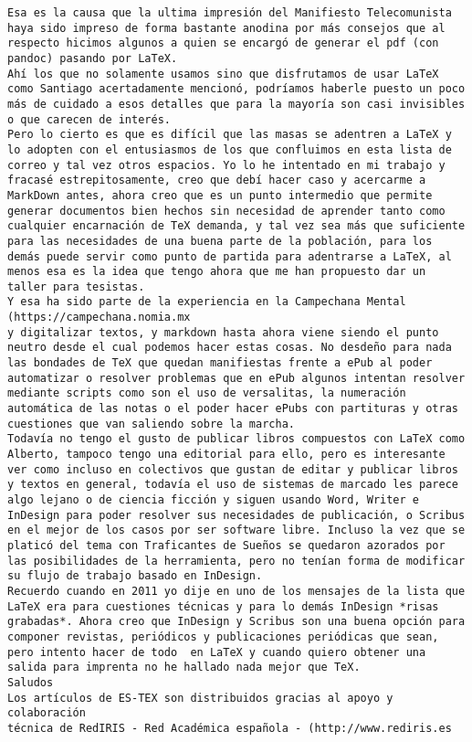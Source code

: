 \documentclass[a4paper,10pt]{article}
\begin{document}
\begin{lstlisting}
Esa es la causa que la ultima impresión del Manifiesto Telecomunista
haya sido impreso de forma bastante anodina por más consejos que al
respecto hicimos algunos a quien se encargó de generar el pdf (con
pandoc) pasando por LaTeX.
Ahí los que no solamente usamos sino que disfrutamos de usar LaTeX
como Santiago acertadamente mencionó, podríamos haberle puesto un poco
más de cuidado a esos detalles que para la mayoría son casi invisibles
o que carecen de interés.
Pero lo cierto es que es difícil que las masas se adentren a LaTeX y
lo adopten con el entusiasmos de los que confluimos en esta lista de
correo y tal vez otros espacios. Yo lo he intentado en mi trabajo y
fracasé estrepitosamente, creo que debí hacer caso y acercarme a
MarkDown antes, ahora creo que es un punto intermedio que permite
generar documentos bien hechos sin necesidad de aprender tanto como
cualquier encarnación de TeX demanda, y tal vez sea más que suficiente
para las necesidades de una buena parte de la población, para los
demás puede servir como punto de partida para adentrarse a LaTeX, al
menos esa es la idea que tengo ahora que me han propuesto dar un
taller para tesistas.
Y esa ha sido parte de la experiencia en la Campechana Mental
(https://campechana.nomia.mx
y digitalizar textos, y markdown hasta ahora viene siendo el punto
neutro desde el cual podemos hacer estas cosas. No desdeño para nada
las bondades de TeX que quedan manifiestas frente a ePub al poder
automatizar o resolver problemas que en ePub algunos intentan resolver
mediante scripts como son el uso de versalitas, la numeración
automática de las notas o el poder hacer ePubs con partituras y otras
cuestiones que van saliendo sobre la marcha.
Todavía no tengo el gusto de publicar libros compuestos con LaTeX como
Alberto, tampoco tengo una editorial para ello, pero es interesante
ver como incluso en colectivos que gustan de editar y publicar libros
y textos en general, todavía el uso de sistemas de marcado les parece
algo lejano o de ciencia ficción y siguen usando Word, Writer e
InDesign para poder resolver sus necesidades de publicación, o Scribus
en el mejor de los casos por ser software libre. Incluso la vez que se
platicó del tema con Traficantes de Sueños se quedaron azorados por
las posibilidades de la herramienta, pero no tenían forma de modificar
su flujo de trabajo basado en InDesign.
Recuerdo cuando en 2011 yo dije en uno de los mensajes de la lista que
LaTeX era para cuestiones técnicas y para lo demás InDesign *risas
grabadas*. Ahora creo que InDesign y Scribus son una buena opción para
componer revistas, periódicos y publicaciones periódicas que sean,
pero intento hacer de todo  en LaTeX y cuando quiero obtener una
salida para imprenta no he hallado nada mejor que TeX.
Saludos
Los artículos de ES-TEX son distribuidos gracias al apoyo y colaboración 
técnica de RedIRIS - Red Académica española - (http://www.rediris.es

\end{lstlisting}
\end{document}
